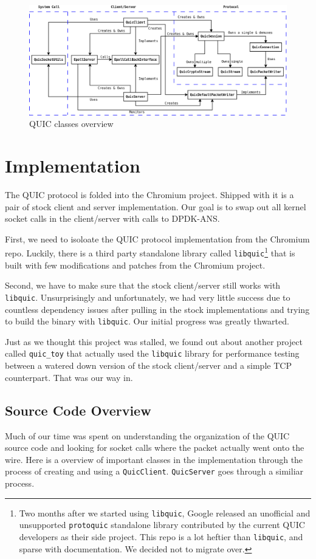 \documentclass{sig-alternate-05-2015}
\begin{document}
\begin{figure}
\centering
\includegraphics[scale=0.28]{class.png}
\caption{QUIC classes overview}
\label{fig:quic-classes}
\end{figure}

\section{Implementation}
The QUIC protocol is folded into the Chromium project. Shipped with it is a pair of stock client and server implementation. Our goal is to swap out all kernel socket calls in the client/server with calls to DPDK-ANS. 
 
First, we need to isoloate the QUIC protocol implementation from the Chromium repo. Luckily, there is a third party standalone library called \texttt{libquic}\footnote{Two months after we started using \texttt{libquic}, Google released an unofficial and unsupported \texttt{protoquic} standalone library contributed by the current QUIC developers as their side project. This repo is a lot heftier than \texttt{libquic}, and sparse with documentation. We decided not to migrate over.} that is built with few modifications and patches from the Chromium project. 

Second, we have to make sure that the stock client/server still works with \texttt{libquic}. Unsurprisingly and unfortunately, we had very little success due to countless dependency issues after pulling in the stock implementations and trying to build the binary with \texttt{libquic}. Our initial progress was greatly thwarted. 

Just as we thought this project was stalled, we found out about another project called \texttt{quic\_toy} that actually used the \texttt{libquic} library for performance testing between a watered down version of the stock client/server and a simple TCP counterpart. That was our way in. 

\subsection{Source Code Overview}
Much of our time was spent on understanding the organization of the QUIC source code and looking for socket calls where the packet actually went onto the wire. Here is a overview of important classes in the implementation through the process of creating and using a \texttt{QuicClient}. \texttt{QuicServer} goes through a similiar process.
\end{document}
